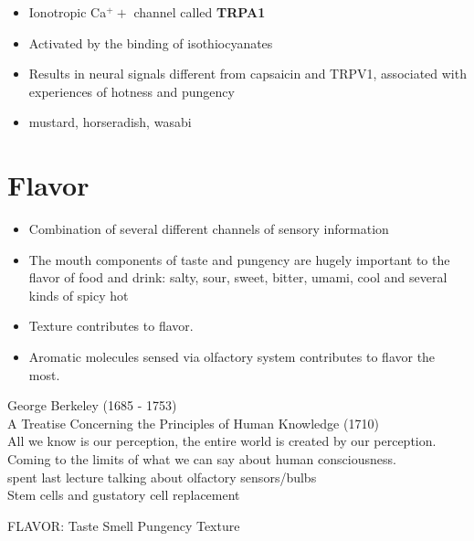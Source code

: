 \documentclass{article}
\begin{document}
\begin{itemize}
    \item Ionotropic Ca$^++$ channel called \textbf{TRPA1}
    \item Activated by the binding of isothiocyanates
    \item Results in neural signals different from capsaicin and TRPV1, associated with experiences of hotness and pungency
    \item mustard, horseradish, wasabi
\end{itemize}

\newpage
\section{Flavor}
\begin{itemize}
    \item Combination of several different channels of sensory information 
    \item The mouth components of taste and pungency are hugely important to the flavor of food and drink: salty, sour, sweet, bitter, umami, cool and several kinds of spicy hot 
    \item Texture contributes to flavor. 
    \item Aromatic molecules sensed via olfactory system contributes to flavor the most. 
\end{itemize}



\newpage
George Berkeley (1685 - 1753) \\
A Treatise Concerning the Principles of Human Knowledge (1710) \\
All we know is our perception, the entire world is created by our perception. \\
Coming to the limits of what we can say about human consciousness. \\
spent last lecture talking about olfactory sensors/bulbs \\

Stem cells and gustatory cell replacement

FLAVOR: 
    Taste
    Smell
    Pungency
    Texture
    
\end{document}
